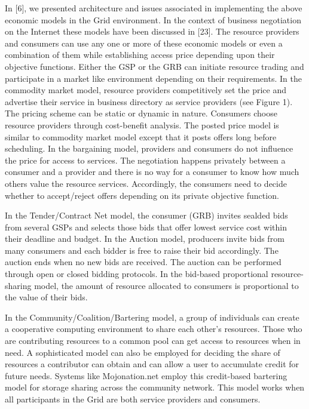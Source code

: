 \documentclass{article}
\begin{document}
In [6], we presented architecture and issues associated in implementing the above economic models in the Grid environment. In the context of business negotiation on the Internet these models have been discussed in [23]. The resource providers and consumers can use any one or more of these economic models or even a combination of them while establishing access price depending upon their objective functions. Either the GSP or the GRB can initiate resource trading and participate in a market like environment depending on their requirements. In the commodity market model, resource providers competitively set the price and advertise their service in business directory as service providers (see Figure 1). The pricing scheme can be static or dynamic in nature. Consumers choose resource providers through cost-benefit analysis. The posted price model is similar to commodity market model except that it posts offers long before scheduling. In the bargaining model, providers and consumers do not influence the price for access to services. The negotiation happens privately between a consumer and a provider and there is no way for a consumer to know how much others value the resource services. Accordingly, the consumers need to decide whether to accept/reject offers depending on its private objective function. 

In the Tender/Contract Net model, the consumer (GRB) invites sealded bids from several GSPs and selects those bids that offer lowest service cost within their deadline and budget. In the Auction model, producers invite bids from many consumers and each bidder is free to raise their bid accordingly. The auction ends when no new bids are received. The auction can be performed through open or closed bidding protocols. In the bid-based proportional resource-sharing model, the amount of resource allocated to consumers is proportional to the value of their bids.

In the Community/Coalition/Bartering model, a group of individuals can create a cooperative computing environment to share each other's resources. Those who are contributing resources to a common pool can get access to resources when in need. A sophisticated model can also be employed for deciding the share of resources a contributor can obtain and can allow a user to accumulate credit for future needs. Systems like Mojonation.net employ this credit-based bartering model for storage sharing across the community network. This model works when all participants in the Grid are both service providers and consumers. 



% 



\end{document}
